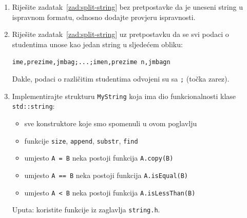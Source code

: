 \begin{razmisljanje}
    \begin{enumerate}
        \item Riješite zadatak~\ref{zad:split-string} bez pretpostavke da je uneseni string u ispravnom formatu, odnosno dodajte provjeru ispravnosti.
        \item Riješite zadatak~\ref{zad:split-string} uz pretpostavku da se svi podaci o studentima unose kao jedan string u sljedećem obliku:
         \begin{center}
             \texttt{ime,prezime,jmbag;...;ime\textunderscore n,prezime \textunderscore n,jmbag\textunderscore n}
         \end{center}   
         Dakle, podaci o različitim studentima odvojeni su sa \texttt{;} (točka zarez).
         \item Implementirajte strukturu \texttt{MyString} koja ima dio funkcionalnosti klase \texttt{std::string}:
                \begin{itemize}
                    \item sve konstruktore koje smo spomenuli u ovom poglavlju
                    \item funkcije \texttt{size}, \texttt{append}, \texttt{substr}, \texttt{find}
                    \item umjesto \texttt{A = B} neka postoji funkcija \texttt{A.copy(B)}
                    \item umjesto \texttt{A == B} neka postoji funkcija \texttt{A.isEqual(B)}
                    \item umjesto \texttt{A < B} neka postoji funkcija \texttt{A.isLessThan(B)}
                \end{itemize}
                Uputa: koristite funkcije iz zaglavlja \texttt{string.h}.
    \end{enumerate}
\end{razmisljanje}
